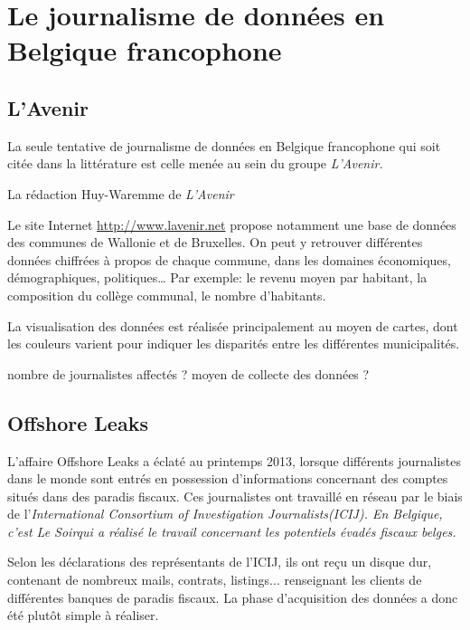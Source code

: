 
\chapter{Le journalisme de données en Belgique francophone}

\section{L'Avenir}
La seule tentative de journalisme de données en Belgique francophone qui soit citée dans la littérature est celle menée au sein du groupe \em L'Avenir\em.

La rédaction Huy-Waremme de \textit{L'Avenir}


Le site Internet \url{http://www.lavenir.net} propose notamment une base de données des communes de Wallonie et de Bruxelles. On peut y retrouver différentes données chiffrées à propos de chaque commune, dans les domaines économiques, démographiques, politiques\dots
Par exemple: le revenu moyen par habitant, la composition du collège communal, le nombre d'habitants.

La visualisation des données est réalisée principalement au moyen de cartes, dont les couleurs varient pour indiquer les disparités entre les différentes municipalités. 


nombre de journalistes affectés ?  moyen de collecte des données ?

\section{Offshore Leaks}

L'affaire \og Offshore Leaks \fg a éclaté au printemps 2013, lorsque différents journalistes dans le monde sont entrés en possession d'informations concernant des comptes situés dans des paradis fiscaux. Ces journalistes ont travaillé en réseau par le biais de l'\em International Consortium of Investigation Journalists\em (ICIJ). En Belgique, c'est \em Le Soir\em qui a réalisé le travail concernant les potentiels évadés fiscaux belges.

Selon les déclarations des représentants de l'ICIJ, ils ont reçu un disque dur, contenant de nombreux mails, contrats, listings... renseignant les clients de différentes banques de paradis fiscaux. La phase d'acquisition des données a donc été plutôt simple à réaliser.

